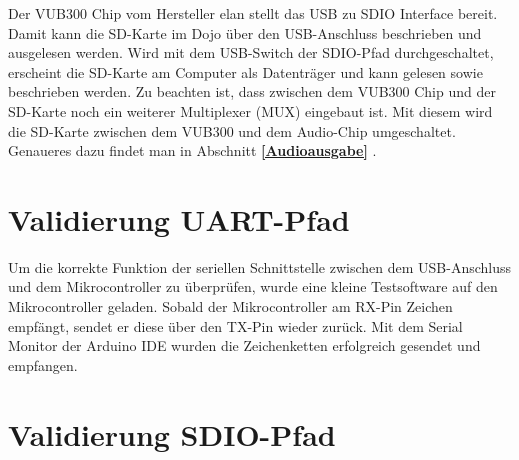 Der VUB300 Chip vom Hersteller elan stellt das USB zu SDIO Interface bereit. Damit kann die SD-Karte im Dojo über den USB-Anschluss beschrieben und ausgelesen werden. Wird mit dem USB-Switch der SDIO-Pfad durchgeschaltet, erscheint die SD-Karte am Computer als Datenträger und kann gelesen sowie beschrieben werden. Zu beachten ist, dass zwischen dem VUB300 Chip und der SD-Karte noch ein weiterer Multiplexer (MUX) eingebaut ist. Mit diesem wird die SD-Karte zwischen dem VUB300 und dem Audio-Chip umgeschaltet. Genaueres dazu findet man in Abschnitt \textbf{\ref{Audioausgabe} }.




\section{Validierung UART-Pfad}

Um die korrekte Funktion der seriellen Schnittstelle zwischen dem USB-Anschluss und dem Mikrocontroller zu überprüfen, wurde eine kleine Testsoftware auf den Mikrocontroller geladen. Sobald der Mikrocontroller am RX-Pin Zeichen empfängt, sendet	er diese über den TX-Pin wieder zurück. Mit dem Serial Monitor der Arduino IDE wurden die Zeichenketten erfolgreich gesendet und empfangen.

\section{Validierung SDIO-Pfad}